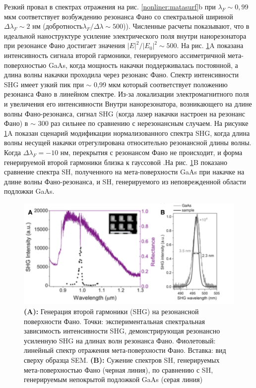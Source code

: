 Резкий провал в спектрах отражения на рис. \ref{nonliner:matasurf}b при $\lambda_{F} \sim0,99$  мкм соответствует возбуждению резонанса Фано со спектральной шириной $\Delta\lambda_{F} \sim 2$ нм (добротность$\lambda_{F} /\Delta\lambda \sim 500$)). Численные расчеты показывают, что в идеальной наноструктуре усиление электрического поля внутри нанорезонатора при резонансе Фано достигает значения $|E|^2/|E_{0}|^2 \sim 500$. На рис. \ref{nonliner:matasurf2}A показана интенсивность сигнала второй гармоники, генерируемого  ассиметричной мета-поверхностью GaAs, когда мощность накачки поддерживалась постоянной, а длина волны накачки проходила через резонанс Фано. Спектр интенсивности SHG имеет узкий пик при $\sim$ 0,99 мкм который соответствует положению резонанса Фано в линейном спектре. Из-за локализации электромагнитного поля и увеличения его интенсивности Внутри нанорезонатора, возникающего на длине волны Фано-резонанса, сигнал SHG  (когда лазер накачки настроен на резонанс Фано) в  $\sim$ 300 раз сильнее по сравнению с нерезонансным случаем. На рисунке \ref{nonliner:matasurf2}A показан сценарий модификации нормализованного спектра SHG, когда длина волны несущей накачки отрегулирована относительно резонансной длины волны. Когда $\Delta\lambda_{F} = -10$ нм, перекрытия с резонансом Фано не происходит, и форма генерируемой второй гармоники близка к гауссовой .На рис. \ref{nonliner:matasurf2}B показано сравнение спектра SH, полученного на мета-поверхности GaAs при накачке на длине волны Фано-резонанса, и SH, генерируемого из неповрежденной области подложки GaAs. 
 \begin{figure}[h!]
	\centering
	\includegraphics[width=0.7\linewidth]{images/fig7.png}
	\caption{\textbf{(A): }Генерация второй гармоники (SHG) на резонансной поверхности Фано. Точки: экспериментальная спектральная зависимость интенсивности SHG, демонстрирующая резонансно усиленную SHG на длинах волн резонанса Фано. Фиолетовый: линейный спектр отражения мета-поверхности Фано. Вставка: вид сверху образца SEM. \textbf{(B):} Сужение спектров SH, генерируемых мета-поверхностью Фано (черная линия), по сравнению с SH, генерируемым непокрытой подложкой GaAs (серая линия)}
	\label{nonliner:matasurf2}
\end{figure}


